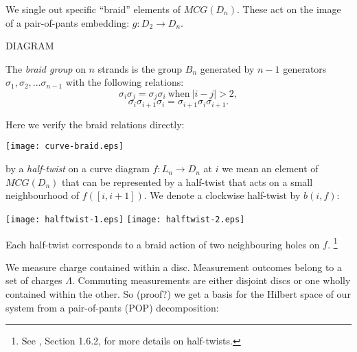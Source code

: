 \documentclass[11pt,a4paper]{article}
\begin{document}

We single out specific ``braid'' elements of $MCG(D_n)$.
These act on the image of a pair-of-pants embedding: $g:D_2\to D_n.$

DIAGRAM

The {\it braid group} on $n$ strands is the group $B_n$ generated by $n-1$ generators
$\sigma_1, \sigma_2, ... \sigma_{n-1}$ with the following relations:
    $$ \sigma_i \sigma_j = \sigma_j \sigma_i \ \text{when}\ |i-j| > 2, $$
    $$ \sigma_i \sigma_{i+1} \sigma_i =  \sigma_{i+1} \sigma_i \sigma_{i+1}.$$


Here we verify the braid relations directly:

\begin{center}
\texttt{[image: curve-braid.eps]}
\end{center}


 by a {\it half-twist} on a curve
diagram $f:L_n\to D_n$ at $i$ we mean an element of $MCG(D_n)$
that can be represented by a half-twist that acts
on a small neighbourhood of $f([i, i+1]).$
We denote a clockwise half-twist by $b(i, f):$

\begin{center}
\texttt{[image: halftwist-1.eps]}
\texttt{[image: halftwist-2.eps]}
\end{center}

Each half-twist corresponds to a braid action of two neighbouring
holes on $f$.
\footnote{See \cite{Kassel10}, Section 1.6.2, for more details on half-twists.}




We measure charge contained within a disc. %
Measurement outcomes belong to a set of charges $\Lambda.$
Commuting measurements are either disjoint discs or
one wholly contained within the other.
So (proof?) we get a basis for the Hilbert space of our system from
a pair-of-pants (POP) decomposition:

\end{document}

